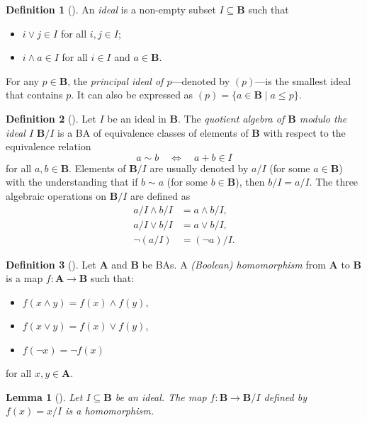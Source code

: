 \documentclass{article}
\newtheorem{lemma}{Lemma}
\theoremstyle{definition}
\newtheorem{definition}{Definition}
\theoremstyle{remark}
\begin{document}
\begin{definition}[\cite{givant2008introduction}] \label{def:ideal}
  An \emph{ideal} is a non-empty subset $I \subseteq \mathbf{B}$ such that
  \begin{itemize}
  \item $i \lor j \in I$ for all $i, j \in I$;
  \item $i \land a \in I$ for all $i \in I$ and $a \in \mathbf{B}$.
  \end{itemize}
  For any $p \in \mathbf{B}$, the \emph{principal ideal of $p$}---denoted by
  $(p)$---is the smallest ideal that contains $p$. It can also be expressed as
  $(p) = \{ a \in \mathbf{B} \mid a \le p \}$.
\end{definition}

\begin{definition}[\cite{givant2008introduction}] \label{def:quotient}
  Let $I$ be an ideal in $\mathbf{B}$. The \emph{quotient algebra of
    $\mathbf{B}$ modulo the ideal $I$} $\mathbf{B}/I$ is a BA
  of equivalence classes of elements of $\mathbf{B}$ with respect to the
  equivalence relation
  \[
    a \sim b \quad \iff \quad a + b \in I
  \]
  for all $a, b \in \mathbf{B}$. Elements of $\mathbf{B}/I$ are usually denoted
  by $a/I$ (for some $a \in \mathbf{B}$) with the understanding that if $b \sim
  a$ (for some $b \in \mathbf{B}$), then $b/I = a/I$. The three algebraic
  operations on $\mathbf{B}/I$ are defined as
  \begin{align*}
    a/I \land b/I &= a \land b / I, \\
    a/I \lor b/I &= a \lor b / I, \\
    \neg(a/I) &= (\neg a)/I.
  \end{align*}
\end{definition}

\begin{definition}[\cite{givant2008introduction}]
  Let $\mathbf{A}$ and $\mathbf{B}$ be BAs. A \emph{(Boolean) homomorphism} from
  $\mathbf{A}$ to $\mathbf{B}$ is a map $f\colon \mathbf{A} \to \mathbf{B}$ such
  that:
  \begin{itemize}
  \item $f(x \land y) = f(x) \land f(y)$,
  \item $f(x \lor y) = f(x) \lor f(y)$,
  \item $f(\neg x) = \neg f(x)$
  \end{itemize}
  for all $x, y \in \mathbf{A}$.
\end{definition}

\begin{lemma}[\cite{givant2008introduction}] \label{lemma:canonical_homomorphism}
  Let $I \subseteq \mathbf{B}$ be an ideal. The map $f\colon \mathbf{B} \to
  \mathbf{B}/I$ defined by $f(x) = x/I$ is a homomorphism.
\end{lemma}
\end{document}
